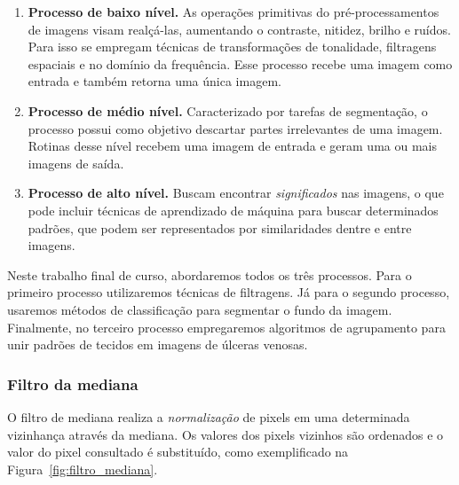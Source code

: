 \begin{enumerate}
    \item \textbf{Processo de baixo nível.}
    As operações primitivas do pré-processamentos de imagens visam realçá-las, aumentando o contraste, nitidez, brilho e ruídos.
    Para  isso se empregam  técnicas de transformações de tonalidade, filtragens espaciais e no domínio da frequência. 
    Esse processo recebe uma imagem como entrada e também retorna uma única imagem. 
    
    \item \textbf{Processo de médio nível.}
    Caracterizado por tarefas de segmentação, o processo possui como objetivo descartar partes irrelevantes de uma imagem.
    Rotinas desse nível recebem uma imagem de entrada e geram uma ou mais imagens de saída.
    
    \item \textbf{Processo de alto nível.}
    Buscam encontrar \textit{significados} nas imagens, o que pode incluir técnicas de aprendizado de máquina para buscar determinados padrões, que podem ser representados por similaridades dentre e entre imagens.
\end{enumerate}

Neste trabalho final de curso, abordaremos todos os três processos. 
Para o primeiro processo utilizaremos técnicas de filtragens.
Já para o segundo processo, usaremos métodos de classificação para segmentar o fundo da imagem.
Finalmente, no terceiro processo empregaremos algoritmos de agrupamento para unir padrões de tecidos em imagens de úlceras venosas.

\subsubsection{Filtro da mediana}

O filtro de mediana realiza a \textit{normalização} de pixels em uma determinada vizinhança através da mediana.
Os valores dos pixels vizinhos são ordenados e o valor do pixel consultado é substituído, como exemplificado na Figura~\ref{fig:filtro_mediana}.

